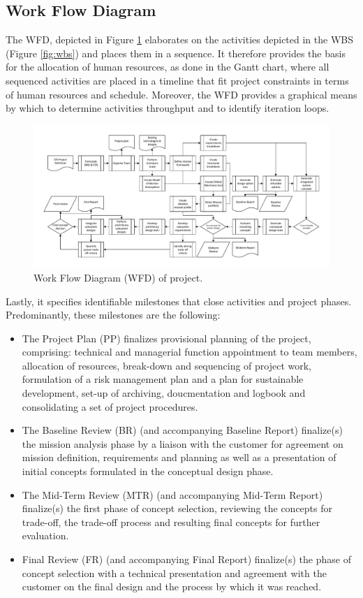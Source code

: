 \subsection{Work Flow Diagram}\label{sec:WFD}
The WFD, depicted in Figure \ref{fig:wfd} elaborates on the activities depicted in the WBS (Figure \ref{fig:wbs}) and places them in a sequence. It therefore provides the basis for the allocation of human resources, as done in the Gantt chart, where all sequenced activities are placed in a timeline that fit project constraints in terms of human resources and schedule. Moreover, the WFD provides a graphical means by which to determine activities throughput and to identify iteration loops. 

\begin{figure}
    \includegraphics[scale=0.8]{Figure/WFD2.pdf}
    \caption{Work Flow Diagram (WFD) of project.}
    \label{fig:wfd}
\end{figure}

Lastly, it specifies identifiable milestones that close activities and project phases. Predominantly, these milestones are the following:
\begin{itemize}
\item The Project Plan (PP) finalizes provisional planning of the project, comprising: technical and managerial function appointment to team members, allocation of resources, break-down and sequencing of project work, formulation of a risk management plan and a plan for sustainable development, set-up of archiving, doucmentation and logbook and consolidating a set of project procedures.
\item The Baseline Review (BR) (and accompanying Baseline Report) finalize(s) the mission analysis phase by a liaison with the customer for agreement on mission definition, requirements and planning as well as a presentation of initial concepts formulated in the conceptual design phase.
\item The Mid-Term Review (MTR) (and accompanying Mid-Term Report) finalize(s) the first phase of concept selection, reviewing the concepts for trade-off, the trade-off process and resulting final concepts for further evaluation.
\item Final Review (FR) (and accompanying Final Report) finalize(s) the phase of concept selection with a technical presentation and agreement with the customer on the final design and the process by which it was reached. 
\end{itemize}

